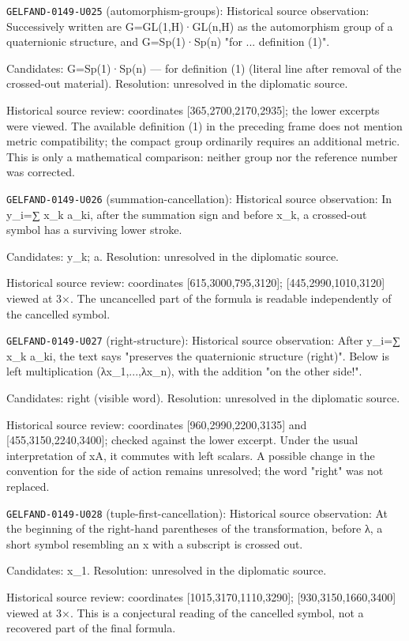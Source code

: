 \noindent\texttt{GELFAND-0149-U025} (automorphism-groups): Historical source observation: Successively written are G=GL(1,H)·GL(n,H) as the automorphism group of a quaternionic structure, and G=Sp(1)·Sp(n) "for ... definition (1)".\par
Candidates: G=Sp(1)·Sp(n) --- for definition (1) (literal line after removal of the crossed-out material). Resolution: unresolved in the diplomatic source.\par
Historical source review: coordinates [365,2700,2170,2935]; the lower excerpts were viewed. The available definition (1) in the preceding frame does not mention metric compatibility; the compact group ordinarily requires an additional metric. This is only a mathematical comparison: neither group nor the reference number was corrected.\par

\noindent\texttt{GELFAND-0149-U026} (summation-cancellation): Historical source observation: In y\_i=∑ x\_k a\_ki, after the summation sign and before x\_k, a crossed-out symbol has a surviving lower stroke.\par
Candidates: y\_k; a. Resolution: unresolved in the diplomatic source.\par
Historical source review: coordinates [615,3000,795,3120]; [445,2990,1010,3120] viewed at 3×. The uncancelled part of the formula is readable independently of the cancelled symbol.\par

\noindent\texttt{GELFAND-0149-U027} (right-structure): Historical source observation: After y\_i=∑ x\_k a\_ki, the text says "preserves the quaternionic structure (right)". Below is left multiplication (λx\_1,...,λx\_n), with the addition "on the other side!".\par
Candidates: right (visible word). Resolution: unresolved in the diplomatic source.\par
Historical source review: coordinates [960,2990,2200,3135] and [455,3150,2240,3400]; checked against the lower excerpt. Under the usual interpretation of xA, it commutes with left scalars. A possible change in the convention for the side of action remains unresolved; the word "right" was not replaced.\par

\noindent\texttt{GELFAND-0149-U028} (tuple-first-cancellation): Historical source observation: At the beginning of the right-hand parentheses of the transformation, before λ, a short symbol resembling an x with a subscript is crossed out.\par
Candidates: x\_1. Resolution: unresolved in the diplomatic source.\par
Historical source review: coordinates [1015,3170,1110,3290]; [930,3150,1660,3400] viewed at 3×. This is a conjectural reading of the cancelled symbol, not a recovered part of the final formula.\par

